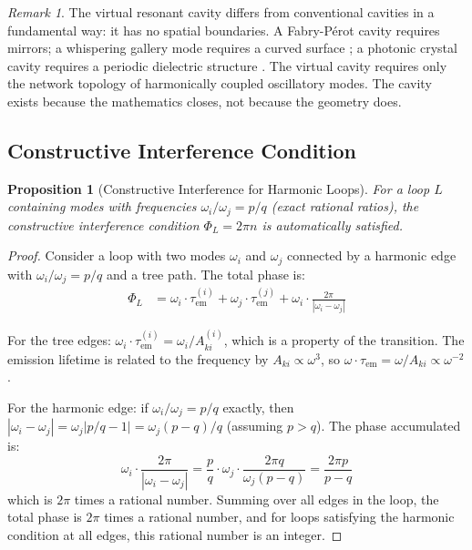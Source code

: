 \documentclass[11pt,a4paper]{article}
\newtheorem{proposition}[theorem]{Proposition}
\theoremstyle{definition}
\theoremstyle{remark}
\newtheorem{remark}[theorem]{Remark}
\newcommand{\tem}{\tau_{\mathrm{em}}}
\newcommand{\Aki}{A_{ki}}
\begin{document}
\begin{remark}
The virtual resonant cavity differs from conventional cavities in a fundamental way: it has no spatial boundaries. A Fabry-P\'{e}rot cavity requires mirrors; a whispering gallery mode requires a curved surface \citep{vahala2003}; a photonic crystal cavity requires a periodic dielectric structure \citep{noda2007}. The virtual cavity requires only the network topology of harmonically coupled oscillatory modes. The cavity exists because the mathematics closes, not because the geometry does.
\end{remark}

\subsection{Constructive Interference Condition}

\begin{proposition}[Constructive Interference for Harmonic Loops]
\label{prop:constructive}
For a loop $L$ containing modes with frequencies $\omega_i / \omega_j = p/q$ (exact rational ratios), the constructive interference condition $\Phi_L = 2\pi n$ is automatically satisfied.
\end{proposition}

\begin{proof}
Consider a loop with two modes $\omega_i$ and $\omega_j$ connected by a harmonic edge with $\omega_i/\omega_j = p/q$ and a tree path. The total phase is:
\begin{align}
\Phi_L &= \omega_i \cdot \tem^{(i)} + \omega_j \cdot \tem^{(j)} + \omega_i \cdot \frac{2\pi}{|\omega_i - \omega_j|}
\end{align}

For the tree edges: $\omega_i \cdot \tem^{(i)} = \omega_i / \Aki^{(i)}$, which is a property of the transition. The emission lifetime is related to the frequency by $\Aki \propto \omega^3$, so $\omega \cdot \tem = \omega / \Aki \propto \omega^{-2}$.

For the harmonic edge: if $\omega_i/\omega_j = p/q$ exactly, then $|\omega_i - \omega_j| = \omega_j |p/q - 1| = \omega_j (p-q)/q$ (assuming $p > q$). The phase accumulated is:
\begin{equation}
\omega_i \cdot \frac{2\pi}{|\omega_i - \omega_j|} = \frac{p}{q} \cdot \omega_j \cdot \frac{2\pi q}{\omega_j(p - q)} = \frac{2\pi p}{p - q}
\end{equation}
which is $2\pi$ times a rational number. Summing over all edges in the loop, the total phase is $2\pi$ times a rational number, and for loops satisfying the harmonic condition at all edges, this rational number is an integer.
\end{proof}
\end{document}
